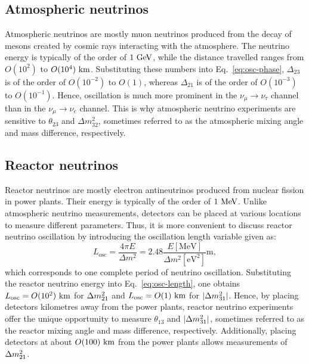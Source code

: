 \subsection{Atmospheric neutrinos}
Atmospheric neutrinos are mostly muon neutrinos produced from the decay of mesons created by cosmic rays interacting with the atmosphere.
The neutrino energy is typically of the order of $1~\textrm{GeV}$, while the distance travelled ranges from $O(10^2)$ to $O(10^4)~\textrm{km}$.
Substituting these numbers into Eq.~\ref{eq:osc-phase}, $\Delta_{23}$ is of the order of $O(10^{-2})$ to $O(1)$, whereas $\Delta_{21}$ is of the order of $O(10^{-3})$ to $O(10^{-1})$.
Hence, oscillation is much more prominent in the $\nu_\mu \to \nu_\tau$ channel than in the $\nu_\mu \to \nu_e$ channel.
This is why atmospheric neutrino experiments are sensitive to $\theta_{23}$ and $\Delta m^2_{32}$, sometimes referred to as the atmospheric mixing angle and mass difference, respectively.

\subsection{Reactor neutrinos}
Reactor neutrinos are mostly electron antineutrinos produced from nuclear fission in power plants.
Their energy is typically of the order of $1~\textrm{MeV}$.
Unlike atmospheric neutrino measurements, detectors can be placed at various locations to measure different parameters.
Thus, it is more convenient to discuss reactor neutrino oscillation by introducing the oscillation length variable given as:
\begin{equation}
  \label{eq:osc-length}
  L_{\text{osc}} = \frac{4\pi E}{\Delta m^2} = 2.48 \frac{E [\text{MeV}]}{\Delta m^2 [\text{eV}^2]} \text{m},
\end{equation}
which corresponds to one complete period of neutrino oscillation.
Substituting the reactor neutrino energy into Eq.~\ref{eq:osc-length}, one obtains $L_{\text{osc}} = O(10^2)~\textrm{km}$ for $\Delta m^2_{21}$ and $L_{\text{osc}} = O(1)~\textrm{km}$ for $|\Delta m^2_{31}|$. 
Hence, by placing detectors kilometres away from the power plants, reactor neutrino experiments offer the unique opportunity to measure $\theta_{13}$ and $|\Delta m^2_{31}|$, sometimes referred to as the reactor mixing angle and mass difference, respectively.
Additionally, placing detectors at about $O(100)~\textrm{km}$ from the power plants allows measurements of $\Delta m^2_{21}$.

